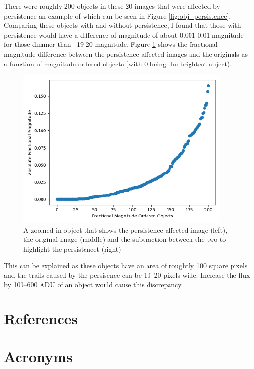 \documentclass[DM,authoryear,toc]{lsstdoc}
\begin{document}
There were roughly 200 objects in these 20 images that were affected by persistence an example of which can be seen in Figure \ref{fig:obj_persistence}.
Comparing these objects with and without persistence, 
I found that those with persistence would have a difference of magnitude of about 0.001-0.01 magnitude for those dimmer than ~19-20 magnitude. 
Figure \ref{fig:absolute_fractional_flux} shows the fractional magnitude difference between the persistence affected images and the originals
 as a function of magnitude ordered objects (with 0 being the brightest object).

\begin{figure}[!htp]
  \centering
  \includegraphics[width=0.95\textwidth, angle=0]{Absolute_Fractional_Magnitude.png}
  \caption{
  A zoomed in object that shows the persistence affected image (left), the original image (middle) 
  and the subtraction between the two to highlight the persistencet (right)
  }
\label{fig:absolute_fractional_flux}
\end{figure}

This can be explained as these objects have an area of roughtly 100 square pixels and the trails caused by the persisence can be 10--20 pixels wide.
Increase the flux by 100--600 ADU of an object would cause this discrepancy.


\appendix
\section{References} \label{sec:bib}
\renewcommand{\refname}{} %


\section{Acronyms} \label{sec:acronyms}

\end{document}
